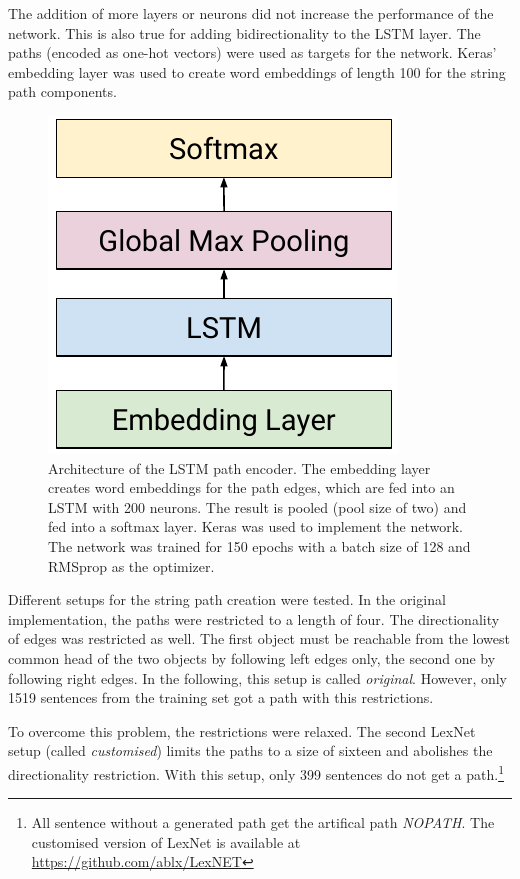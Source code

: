 The addition of more layers or neurons did not increase the performance of the network. This is also true for adding bidirectionality to the LSTM layer. The paths (encoded as one-hot vectors) were used as targets for the network. Keras' embedding layer was used to create word embeddings of length 100 for the string path components.

\begin{figure}[htbp]
\centering
\caption{Architecture of the LSTM path encoder. The embedding layer creates word embeddings for the path edges, which are fed into an LSTM with 200 neurons. The result is pooled (pool size of two) and fed into a softmax layer. Keras \cite{chollet2015keras} was used to implement the network. The network was trained for 150 epochs with a batch size of 128 and RMSprop as the optimizer.}
\label{fig:lexnetnn}
\includegraphics{images/lex_arch}
\end{figure}



Different setups for the string path creation were tested. In the original implementation, the paths were restricted to a length of four. The directionality of edges was restricted as well. The first object must be reachable from the lowest common head of the two objects by following left edges only, the second one by following right edges. In the following, this setup is called \emph{original}. However, only 1519 sentences from the training set got a path with this restrictions. 

To overcome this problem, the restrictions were relaxed. The second LexNet setup (called \emph{customised}) limits the paths to a size of sixteen and abolishes the directionality restriction. With this setup, only 399 sentences do not get a path.\footnote{All sentence without a generated path get the artifical path \emph{NOPATH}. The customised version of LexNet is available at \url{https://github.com/ablx/LexNET}}






